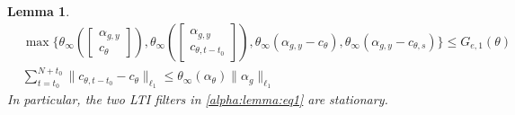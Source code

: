 \documentclass{article}
\newtheorem{lemma}[theorem]{Lemma}
\newcommand{\e}{\mathbf{e}}
\newcommand{\y}{\mathbf{y}}
\newcommand{\bE}{\mathbf{E}}
\begin{document}
\begin{lemma}
\begin{align}
& \max\{
  \theta_{\infty}\left(\begin{bmatrix} \alpha_{g,y} \\ c_{\theta} \end{bmatrix}\right),
  \theta_{\infty}\left(\begin{bmatrix} \alpha_{g,y} \\ c_{\theta,t-t_0} \end{bmatrix}\right),
\theta_{\infty}(\alpha_{g,y}-c_{\theta}), \theta_{\infty}(\alpha_{g,y}-c_{\theta,s})\} \le G_{e,1}(\theta) \label{alpha:lemma:eq2c} \\
& \sum_{t=t_0}^{N+t_0}\|c_{\theta,t-t_0}-c_{\theta}\|_{\ell_1} \le \theta_{\infty}(\alpha_{\theta})\|\alpha_g\|_{\ell_1} \label{alpha:lemma:eq2d}
  \end{align}
In particular, the two LTI filters in \eqref{alpha:lemma:eq1} are stationary. %
\end{lemma}
\end{document}
